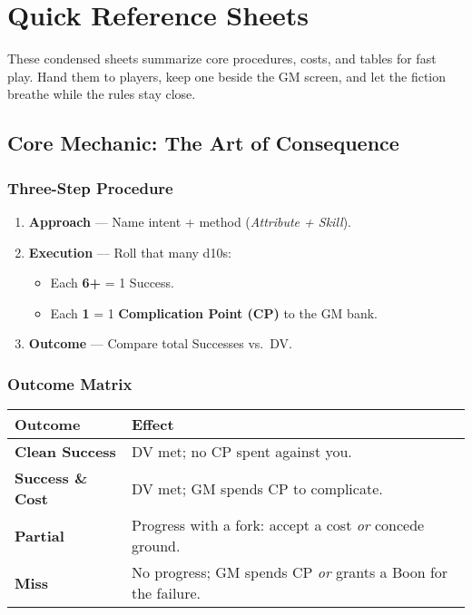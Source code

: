 
\chapter{Quick Reference Sheets}
\label{app:quickref}

\begin{multicols}{2}

These condensed sheets summarize core procedures, costs, and tables for fast play. Hand them to players, keep one beside the GM screen, and let the fiction breathe while the rules stay close.

\section{Core Mechanic: The Art of Consequence}

\subsection*{Three-Step Procedure}
\begin{enumerate}
  \item \textbf{Approach} — Name intent + method (\emph{Attribute + Skill}).
  \item \textbf{Execution} — Roll that many d10s:
  \begin{itemize}
    \item Each \textbf{6+} = 1 Success.
    \item Each \textbf{1} = 1 \textbf{Complication Point (CP)} to the GM bank.
  \end{itemize}
  \item \textbf{Outcome} — Compare total Successes vs.\ DV.
\end{enumerate}

\subsection*{Outcome Matrix}
\begin{center}
\begin{tabular}{lp{7.8cm}}
\toprule
\textbf{Outcome} & \textbf{Effect} \\
\midrule
\textbf{Clean Success} & DV met; no CP spent against you. \\
\textbf{Success \& Cost} & DV met; GM spends CP to complicate. \\
\textbf{Partial} & Progress with a fork: accept a cost \emph{or} concede ground. \\
\textbf{Miss} & No progress; GM spends CP \emph{or} grants a Boon for the failure. \\
\bottomrule
\end{tabular}
\end{center}


\end{multicols}
